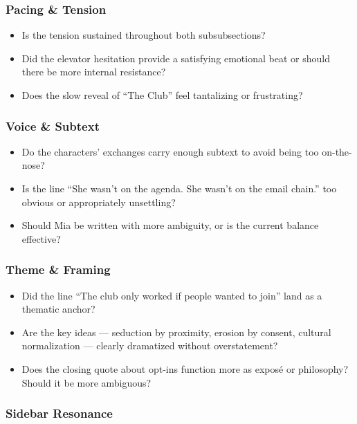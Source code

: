 \subsubsection*{Pacing \& Tension}

\begin{itemize}
  \item Is the tension sustained throughout both subsubsections?
  \item Did the elevator hesitation provide a satisfying emotional beat or should there be more internal resistance?
  \item Does the slow reveal of “The Club” feel tantalizing or frustrating?
\end{itemize}

\subsubsection*{Voice \& Subtext}

\begin{itemize}
  \item Do the characters’ exchanges carry enough subtext to avoid being too on-the-nose?
  \item Is the line ``She wasn’t on the agenda. She wasn’t on the email chain.'' too obvious or appropriately unsettling?
  \item Should Mia be written with more ambiguity, or is the current balance effective?
\end{itemize}

\subsubsection*{Theme \& Framing}

\begin{itemize}
  \item Did the line ``The club only worked if people wanted to join'' land as a thematic anchor?
  \item Are the key ideas — seduction by proximity, erosion by consent, cultural normalization — clearly dramatized without overstatement?
  \item Does the closing quote about opt-ins function more as exposé or philosophy? Should it be more ambiguous?
\end{itemize}

\subsubsection*{Sidebar Resonance}

